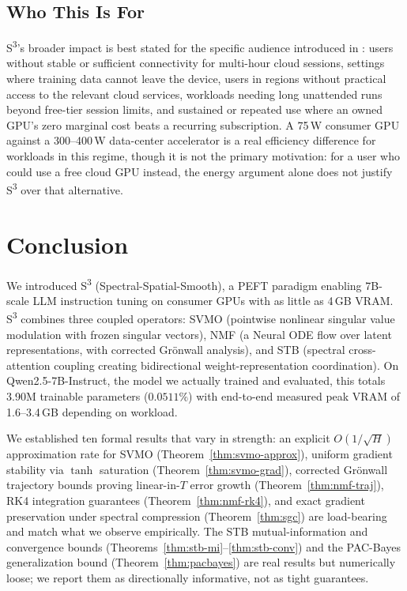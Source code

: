 \documentclass[conference]{IEEEtran}
\newcommand{\sthree}{S\textsuperscript{3}}
\begin{document}
\subsection{Who This Is For}

\sthree{}'s broader impact is best stated for the specific audience introduced in : users without stable or sufficient connectivity for multi-hour cloud sessions, settings where training data cannot leave the device, users in regions without practical access to the relevant cloud services, workloads needing long unattended runs beyond free-tier session limits, and sustained or repeated use where an owned GPU's zero marginal cost beats a recurring subscription. A 75\,W consumer GPU against a 300--400\,W data-center accelerator is a real efficiency difference for workloads in this regime, though it is not the primary motivation: for a user who could use a free cloud GPU instead, the energy argument alone does not justify \sthree{} over that alternative.

\section{Conclusion}

We introduced S\textsuperscript{3} (Spectral-Spatial-Smooth), a PEFT paradigm enabling 7B-scale LLM instruction tuning on consumer GPUs with as little as 4\,GB VRAM. S\textsuperscript{3} combines three coupled operators: SVMO (pointwise nonlinear singular value modulation with frozen singular vectors), NMF (a Neural ODE flow over latent representations, with corrected Gr\"onwall analysis), and STB (spectral cross-attention coupling creating bidirectional weight-representation coordination). On Qwen2.5-7B-Instruct, the model we actually trained and evaluated, this totals 3.90M trainable parameters ($0.0511\%$) with end-to-end measured peak VRAM of 1.6--3.4\,GB depending on workload.

We established ten formal results that vary in strength: an explicit $O(1/\sqrt{H})$ approximation rate for SVMO (Theorem~\ref{thm:svmo-approx}), uniform gradient stability via $\tanh$ saturation (Theorem~\ref{thm:svmo-grad}), corrected Gr\"onwall trajectory bounds proving linear-in-$T$ error growth (Theorem~\ref{thm:nmf-traj}), RK4 integration guarantees (Theorem~\ref{thm:nmf-rk4}), and exact gradient preservation under spectral compression (Theorem~\ref{thm:sgc}) are load-bearing and match what we observe empirically. The STB mutual-information and convergence bounds (Theorems~\ref{thm:stb-mi}--\ref{thm:stb-conv}) and the PAC-Bayes generalization bound (Theorem~\ref{thm:pacbayes}) are real results but numerically loose; we report them as directionally informative, not as tight guarantees.
\end{document}
